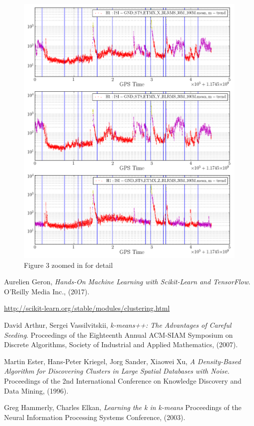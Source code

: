\documentclass[colorlinks=true,pdfstartview=FitV,linkcolor=blue,
            citecolor=red,urlcolor=magenta]{ligodoc}
\begin{document}
\begin{figure}[htbp]
\begin{center}
\includegraphics[scale = 0.5]{Timeshift_Kmeans_all6_crop.png}
\caption{Figure 3 zoomed in for detail}
\label{fig:image4}
\end{center}
\end{figure}

\begin{thebibliography}{9}
      
	  Aurelien Geron,
	  \emph{Hands-On Machine Learning with Scikit-Learn and TensorFlow}.
	  O'Reilly Media Inc., (2017).    
        
          \url{http://scikit-learn.org/stable/modules/clustering.html}

          David Arthur, Sergei Vassilvitskii,
          \emph{k-means++: The Advantages of Careful Seeding}.
          Proceedings of the Eighteenth Annual ACM-SIAM Symposium on Discrete Algorithms, Society of Industrial and Applied Mathematics, (2007).

          Martin Ester, Hans-Peter Kriegel, Jorg Sander, Xiaowei Xu,
          \emph{A Density-Based Algorithm for Discovering Clusters in Large Spatial Databases with Noise}.
          Proceedings of the 2nd International Conference on Knowledge Discovery and Data Mining, (1996).

          Greg Hammerly, Charles Elkan,
          \emph{Learning the k in k-means}
          Proceedings of the Neural Information Processing Systems Conference, (2003).
          
\end{thebibliography}
\end{document}
